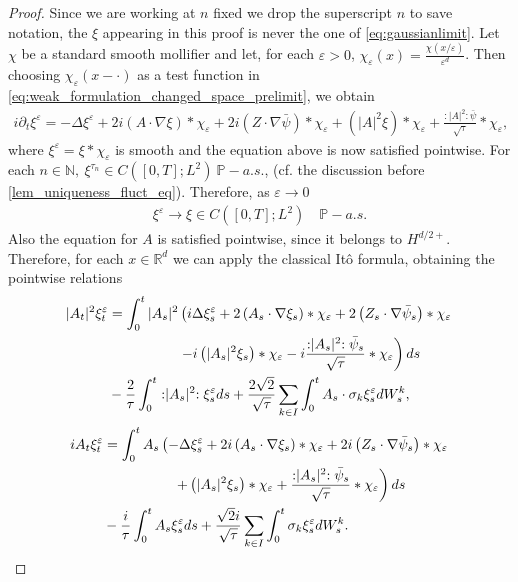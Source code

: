 \documentclass[a4paper,10pt]{amsart}
\newcommand{\N}{\mathbb{N}}
\newcommand{\R}{\mathbb{R}}
\renewcommand{\epsilon}{\varepsilon}
\newcommand{\wick}[1]{:\mathrel{#1}:}
\theoremstyle{remark}
\numberwithin{equation}{section}
\begin{document}
\begin{proof}
   Since we are working at $n$ fixed we drop the superscript $n$ to save notation, the $\xi$ appearing in this proof is never the one of \eqref{eq:gaussianlimit}. Let $\chi$ be a standard smooth mollifier and let, for each $\epsilon>0$, $\chi_{\epsilon}(x)=\frac{\chi(x/\epsilon)}{\epsilon^d}$. Then choosing $\chi_\epsilon(x-\cdot)$ as a test function in \eqref{eq:weak_formulation_changed_space_prelimit}, we obtain
   \begin{align*}
       i\partial_t\xi^{\epsilon}=-\Delta\xi^{\epsilon}+ 2i\left(A\cdot\nabla \xi\right)\ast \chi_{\epsilon}+ 2i\left(Z \cdot\nabla \bar{\psi}\right)\ast \chi_{\epsilon}+\left(|A|^2\xi\right)\ast \chi_{\epsilon}+\frac{\wick{|A|^2}\bar{\psi}}{\sqrt{\tau}}\ast \chi_{\epsilon},
   \end{align*}
   where $\xi^{\epsilon}=\xi\ast \chi_{\epsilon}$ is smooth and the equation above is now satisfied pointwise. For each $n\in \N,\ \xi^{\tau_n}\in C([0,T];L^2)\ \mathbb{P}-a.s.$, (cf. the discussion before \cref{lem_uniqueness_fluct_eq}). Therefore,
   as $\epsilon \to 0$ 
   \begin{align}\label{convergence_convolution}
       \xi^{\epsilon}\rightarrow \xi \in C([0,T];L^2)\quad\mathbb{P}-a.s.
   \end{align}
   Also the equation for $A$ is satisfied pointwise, since it belongs to $H^{d/2+}.$ Therefore, for each $x\in \R^d$ we can apply the classical It\^o formula, obtaining the pointwise relations
   \begin{align}\label{ito_step_1}
     |A_t|^2\xi^{\epsilon}_t&=\int_0^t|A_s|^2\left(i\Delta\xi^{\epsilon}_s+ 2\left(A_s\cdot\nabla \xi_s\right)\ast \chi_{\epsilon}+ 2\left(Z_s \cdot\nabla \bar{\psi}_s\right)\ast \chi_{\epsilon}\right.\notag\\ & \left.\quad \quad \quad\quad \quad -i\left(|A_s|^2\xi_s\right)\ast \chi_{\epsilon}-i\frac{\wick{|A_s|^2}\bar{\psi}_s}{\sqrt{\tau}}\ast \chi_{\epsilon}\right)ds\notag\\ & -\frac{2}{\tau}\int_0^t \wick{|A_s|^2}\xi^{\epsilon}_s ds+\frac{2\sqrt{2}}{\sqrt{\tau}}\sum_{k\in I }\int_0^t A_s\cdot \sigma_k \xi^{\epsilon}_s dW^k_s,
   \end{align}
   \begin{align}\label{ito_step_2}
     iA_t  \xi^{\epsilon}_t&=\int_0^t A_s\left(-\Delta\xi^{\epsilon}_s+ 2i\left(A_s\cdot\nabla \xi_s\right)\ast \chi_{\epsilon}+ 2i\left(Z_s \cdot\nabla \bar{\psi}_s\right)\ast \chi_{\epsilon}\right.\notag\\ & \left.\quad \quad \quad\quad \quad +\left(|A_s|^2\xi_s\right)\ast \chi_{\epsilon}+\frac{\wick{|A_s|^2}\bar{\psi}_s}{\sqrt{\tau}}\ast \chi_{\epsilon}\right)ds\notag\\ & -\frac{i}{\tau}\int_0^t A_s\xi^{\epsilon}_s ds+\frac{\sqrt{2}i}{\sqrt{\tau}}\sum_{k\in I }\int_0^t  \sigma_k \xi^{\epsilon}_s dW^k_s.

\end{align}
\end{proof}
\end{document}
